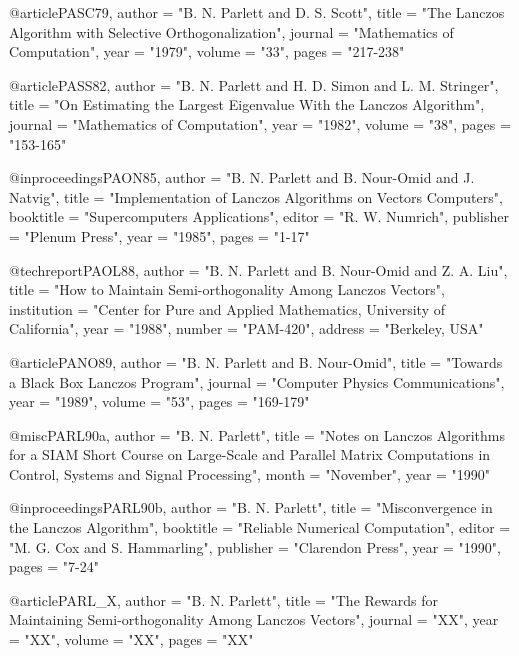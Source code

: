 @article{PASC79,
   author       = "B. N. Parlett and D. S. Scott",
   title        = "{The Lanczos Algorithm with Selective
                   Orthogonalization}",
   journal      = "Mathematics of Computation",
   year         = "1979",
   volume       = "33",
   pages        = "217-238"}

@article{PASS82,
   author       = "B. N. Parlett and H. D. Simon and L. M. Stringer",
   title        = "{On Estimating the Largest Eigenvalue  
                   With the Lanczos Algorithm}",
   journal      = "Mathematics of Computation",
   year         = "1982",
   volume       = "38",
   pages        = "153-165"}

@inproceedings{PAON85,
   author       = "B. N. Parlett and B. Nour-Omid and J. Natvig",
   title        = "{Implementation of Lanczos Algorithms on
                   Vectors Computers}",
   booktitle    = "Supercomputers Applications",
   editor       = "R. W. Numrich",
   publisher    = "Plenum Press",
   year         = "1985",
   pages        = "1-17"}

@techreport{PAOL88,
   author       = "B. N. Parlett and B. Nour-Omid and Z. A. Liu",
   title        = "{How to Maintain Semi-orthogonality Among
                   Lanczos Vectors}",
   institution  = "Center for Pure and Applied Mathematics,
                   University of California",
   year         = "1988",
   number       = "PAM-420",
   address      = "Berkeley, USA"}

@article{PANO89,
   author       = "B. N. Parlett and B. Nour-Omid",
   title        = "{Towards a Black Box Lanczos Program}",
   journal      = "Computer Physics Communications",
   year         = "1989",
   volume       = "53",
   pages        = "169-179"}

@misc{PARL90a,
   author       = "B. N. Parlett",
   title        = "{Notes on Lanczos Algorithms for a SIAM Short Course
                   on Large-Scale and Parallel Matrix Computations in
                   Control, Systems and Signal Processing}",
   month        = "November",
   year         = "1990"}

@inproceedings{PARL90b,
   author       = "B. N. Parlett",
   title        = "{Misconvergence in the Lanczos Algorithm}",
   booktitle    = "Reliable Numerical Computation",
   editor       = "M. G. Cox and S. Hammarling",
   publisher    = "Clarendon Press",
   year         = "1990",
   pages        = "7-24"}

@article{PARL_X,
   author       = "B. N. Parlett",
   title        = "{The Rewards for Maintaining Semi-orthogonality
                   Among Lanczos Vectors}",
   journal      = "XX",
   year         = "XX",
   volume       = "XX",
   pages        = "XX"}

